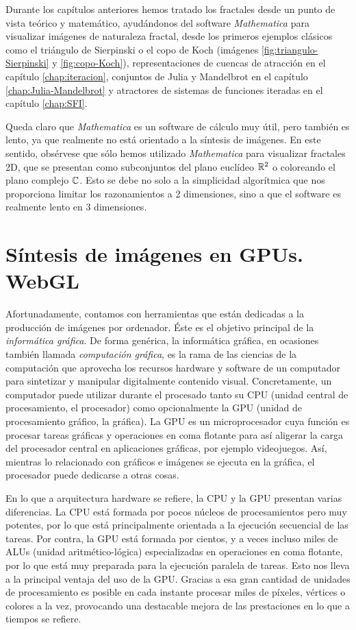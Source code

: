 %
%

Durante los capítulos anteriores hemos tratado los fractales desde un punto de vista teórico y matemático, ayudándonos del software \textit{Mathematica} para visualizar imágenes de naturaleza fractal, desde los primeros ejemplos clásicos como el triángulo de Sierpinski o el copo de Koch (imágenes \ref{fig:triangulo-Sierpinski} y \ref{fig:copo-Koch}), representaciones de cuencas de atracción en el capítulo \ref{chap:iteracion}, conjuntos de Julia y Mandelbrot en el capítulo \ref{chap:Julia-Mandelbrot} y atractores de sistemas de funciones iteradas en el capítulo \ref{chap:SFI}.

Queda claro que \textit{Mathematica} es un software de cálculo muy útil, pero también es lento, ya que realmente no está orientado a la síntesis de imágenes. En este sentido, obsérvese que sólo hemos utilizado \textit{Mathematica} para visualizar fractales 2D, que se presentan como subconjuntos del plano euclídeo $\mathbb{R}^2$ o coloreando el plano complejo $\mathbb{C}$. Esto se debe no solo a la simplicidad algorítmica que nos proporciona limitar los razonamientos a 2 dimensiones, sino a que el software es realmente lento en 3 dimensiones.

\section{Síntesis de imágenes en GPUs. WebGL}

Afortunadamente, contamos con herramientas que están dedicadas a la producción de imágenes por ordenador. Éste es el objetivo principal de la \textit{informática gráfica}. De forma genérica, la informática gráfica, en ocasiones también llamada \textit{computación gráfica}, es la rama de las ciencias de la computación que aprovecha los recursos hardware y software de un computador para sintetizar y manipular digitalmente contenido visual. Concretamente, un computador puede utilizar durante el procesado tanto su CPU (unidad central de procesamiento, el procesador) como opcionalmente la GPU (unidad de procesamiento gráfico, la gráfica). La GPU es un microprocesador cuya función es procesar tareas gráficas y operaciones en coma flotante para así aligerar la carga del procesador central en aplicaciones gráficas, por ejemplo videojuegos. Así, mientras lo relacionado con gráficos e imágenes se ejecuta en la gráfica, el procesador puede dedicarse a otras cosas.

En lo que a arquitectura hardware se refiere, la CPU y la GPU presentan varias diferencias. La CPU está formada por pocos núcleos de procesamientos pero muy potentes, por lo que está principalmente orientada a la ejecución secuencial de las tareas. Por contra, la GPU está formada por cientos, y a veces incluso miles de ALUs (unidad aritmético-lógica) especializadas en operaciones en coma flotante, por lo que está muy preparada para la ejecución paralela de tareas. Esto nos lleva a la principal ventaja del uso de la GPU. Gracias a esa gran cantidad de unidades de procesamiento es posible en cada instante procesar miles de píxeles, vértices o colores a la vez, provocando una destacable mejora de las prestaciones en lo que a tiempos se refiere.

